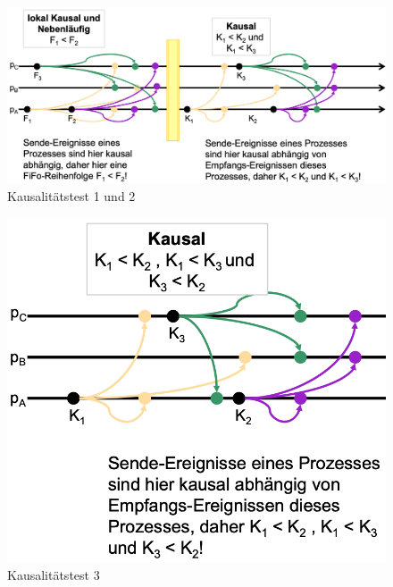 \begin{figure}[htbp]
\begin{center}
\includegraphics[scale=0.25]{Latex/Bilder/Test1_2.png}
\caption{\label{test1_2} Kausalitätstest 1 und 2 \cite{Aufgabenstellung}}
\end{center}
\end{figure}

\begin{figure}[htbp]
\begin{center}
\includegraphics[scale=0.2]{Latex/Bilder/Test3.png}
\caption{\label{test3} Kausalitätstest 3 \cite{Aufgabenstellung}}
\end{center}
\end{figure}

\subsubsection{}

